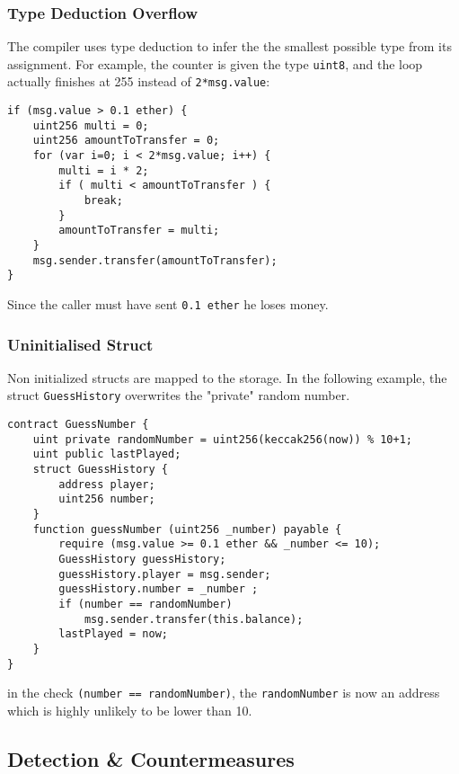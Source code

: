 \subsubsection{Type Deduction Overflow}

The compiler uses type deduction to infer the the smallest possible type from its assignment. For example, the counter is given the type \lstinline[language=Solidity]{uint8}, and the loop actually finishes at 255 instead of \lstinline[language=Solidity]{2*msg.value}:

\begin{lstlisting}[language=Solidity]
if (msg.value > 0.1 ether) {
    uint256 multi = 0;
    uint256 amountToTransfer = 0;
    for (var i=0; i < 2*msg.value; i++) {
        multi = i * 2;
        if ( multi < amountToTransfer ) {
            break;
        }
        amountToTransfer = multi;
    }
    msg.sender.transfer(amountToTransfer);
}
\end{lstlisting}

Since the caller must have sent \lstinline[language=Solidity]{0.1 ether} he loses money.

\subsubsection{Uninitialised Struct}

Non initialized structs are mapped to the storage. In the following example, the struct \lstinline[language=Solidity]{GuessHistory} overwrites the "private" random number.

\begin{lstlisting}[language=Solidity]
contract GuessNumber {
    uint private randomNumber = uint256(keccak256(now)) % 10+1;
    uint public lastPlayed;
    struct GuessHistory {
        address player;
        uint256 number;
    }
    function guessNumber (uint256 _number) payable {
        require (msg.value >= 0.1 ether && _number <= 10);
        GuessHistory guessHistory;
        guessHistory.player = msg.sender;
        guessHistory.number = _number ;
        if (number == randomNumber)
            msg.sender.transfer(this.balance);
        lastPlayed = now;
    }
}
\end{lstlisting}

in the check \lstinline[language=Solidity]{(number == randomNumber)}, the \lstinline[language=Solidity]{randomNumber} is now an address which is highly unlikely to be lower than 10.

\subsection{Detection \& Countermeasures}

